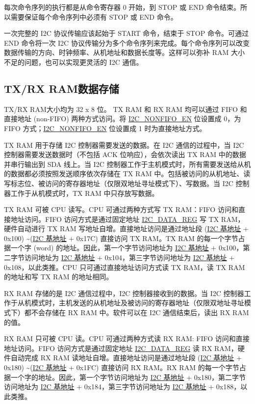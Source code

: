 \documentclass[main\_\_CN.tex]{subfiles}
\begin{document}
每次命令序列的执行都是从命令寄存器 0 开始，到 STOP 或 END 命令结束。所以需要保证每个命令序列中必须有 STOP 或 END 命令。

一次完整的 I2C 协议传输应该起始于 START 命令，结束于 STOP 命令。可通过 END 命令将一次 I2C 协议传输分为多个命令序列来完成。每个命令序列可以改变数据传输的方向、时钟频率、从机地址和数据长度等。这样可以弥补 RAM 大小不足的问题，也可以实现更灵活的 I2C 通信。 

\subsection{TX/RX RAM数据存储}\label{subsubsec:i2c-txrx}
TX/RX RAM大小均为 32 x 8 位。 TX RAM 和 RX RAM 均可以通过 FIFO 和直接地址 (non-FIFO) 两种方式访问。将 \hyperref[fielddesc:I2CNONFIFOEN]{I2C\_NONFIFO\_EN} 位设置成 0，为 FIFO 方式；\hyperref[fielddesc:I2CNONFIFOEN]{I2C\_NONFIFO\_EN} 位设置成 1 时为直接地址方式。

TX RAM 用于存储 I2C 控制器需要发送的数据。在 I2C 通信的过程中，当 I2C 控制器需要发送数据时（不包括 ACK 位响应），会依次读出 TX RAM 中的数据并串行输出到 SDA 线上。当 I2C 控制器工作于主机模式时，所有需要发送给从机的数据都必须按照发送顺序依次存储在 TX RAM 中。包括被访问的从机地址、读写标志位、被访问的寄存器地址（仅限双地址寻址模式下）、写数据。当 I2C 控制器工作于从机模式时，TX RAM 中只存放写数据。

TX RAM 可被 CPU 读写。CPU 可通过两种方式写 TX RAM：FIFO 访问和直接地址访问。FIFO 访问方式是通过固定地址 \hyperref[regdesc:I2CDATAREG]{I2C\_DATA\_REG} 写 TX RAM，硬件自动进行 TX RAM 写地址自增。直接地址访问是通过地址段 (\hyperref[tab:sysmem-base-address]{I2C 基地址} + 0x100) \textasciitilde (\hyperref[tab:sysmem-base-address]{I2C 基地址} + 0x17C) 直接访问 TX RAM。TX RAM 的每一个字节占据一个字 (word) 的地址。因此，第一个字节访问地址为 \hyperref[tab:sysmem-base-address]{I2C 基地址} + 0x100，第二字节访问地址为 \hyperref[tab:sysmem-base-address]{I2C 基地址} + 0x104，第三字节访问地址为 \hyperref[tab:sysmem-base-address]{I2C 基地址} + 0x108，以此类推。CPU 只可通过直接地址访问方式读 TX RAM，读 TX RAM 的地址和写 TX RAM 的地址相同。

RX RAM 存储的是 I2C 通信过程中，I2C 控制器接收到的数据。当 I2C 控制器工作于从机模式时，主机发送的从机地址及被访问的寄存器地址（仅限双地址寻址模式下）都不会存储在 RX RAM 中。软件可以在 I2C 通信结束后，读出 RX RAM 的值。 


RX RAM 只可被 CPU 读。CPU 可通过两种方式读 RX RAM: FIFO 访问和直接地址访问。FIFO 访问方式是通过固定地址 \hyperref[regdesc:I2CDATAREG]{I2C\_DATA\_REG} 读 RX RAM，硬件自动完成 RX RAM 读地址自增。直接地址访问是通过地址段 (\hyperref[tab:sysmem-base-address]{I2C 基地址} + 0x180) \textasciitilde (\hyperref[tab:sysmem-base-address]{I2C 基地址} + 0x1FC) 直接访问 RX RAM。RX RAM 的每一个字节占据一个字的地址。因此，第一个字节访问地址为 \hyperref[tab:sysmem-base-address]{I2C 基地址} + 0x180，第二字节访问地址为 \hyperref[tab:sysmem-base-address]{I2C 基地址} + 0x184，第三字节访问地址为 \hyperref[tab:sysmem-base-address]{I2C 基地址} + 0x188，以此类推。
    
\end{document}
